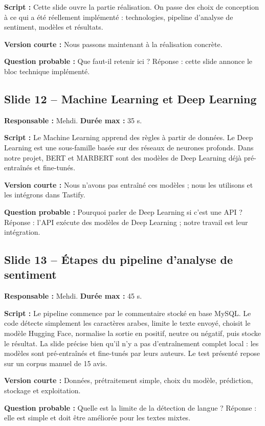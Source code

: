 \documentclass[11pt,a4paper]{article}
\begin{document}
\textbf{Script :} Cette slide ouvre la partie réalisation. On passe des choix de conception à ce qui a été réellement implémenté : technologies, pipeline d'analyse de sentiment, modèles et résultats.

\textbf{Version courte :} Nous passons maintenant à la réalisation concrète.

\textbf{Question probable :} Que faut-il retenir ici ? Réponse : cette slide annonce le bloc technique implémenté.

\subsection*{Slide 12 -- Machine Learning et Deep Learning}
\textbf{Responsable :} Mehdi. \textbf{Durée max :} 35 s.

\textbf{Script :} Le Machine Learning apprend des règles à partir de données. Le Deep Learning est une sous-famille basée sur des réseaux de neurones profonds. Dans notre projet, BERT et MARBERT sont des modèles de Deep Learning déjà pré-entraînés et fine-tunés.

\textbf{Version courte :} Nous n'avons pas entraîné ces modèles ; nous les utilisons et les intégrons dans Tastify.

\textbf{Question probable :} Pourquoi parler de Deep Learning si c'est une API ? Réponse : l'API exécute des modèles de Deep Learning ; notre travail est leur intégration.

\subsection*{Slide 13 -- Étapes du pipeline d'analyse de sentiment}
\textbf{Responsable :} Mehdi. \textbf{Durée max :} 45 s.

\textbf{Script :} Le pipeline commence par le commentaire stocké en base MySQL. Le code détecte simplement les caractères arabes, limite le texte envoyé, choisit le modèle Hugging Face, normalise la sortie en positif, neutre ou négatif, puis stocke le résultat. La slide précise bien qu'il n'y a pas d'entraînement complet local : les modèles sont pré-entraînés et fine-tunés par leurs auteurs. Le test présenté repose sur un corpus manuel de 15 avis.

\textbf{Version courte :} Données, prétraitement simple, choix du modèle, prédiction, stockage et exploitation.

\textbf{Question probable :} Quelle est la limite de la détection de langue ? Réponse : elle est simple et doit être améliorée pour les textes mixtes.
\end{document}
